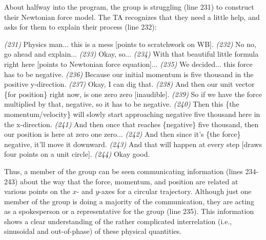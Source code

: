 \documentclass{msuphddissertation}
\begin{document}
\begin{doublespace}
About halfway into the program, the group is struggling (line 231) to construct their Newtonian force model.  The TA recognizes that they need a little help, and asks for them to explain their process (line 232):\begin{description}
\SB \textit{(231)} Physics man... this is a mess [points to scratchwork on WB].
\TA \textit{(232)} No no, go ahead and explain...
\SB \textit{(233)} Okay, so...		
\SB \textit{(234)} With that beautiful little formula right here [points to Newtonian force equation]...	
\SB \textit{(235)} We decided... this {force} has to be negative.
\SB \textit{(236)} Because our initial momentum is five thousand in the positive y-direction.		
\TA \textit{(237)} Okay, I can dig that.
\SB \textit{(238)} And then our unit vector \{for position\} right now, is one zero zero [inaudible].
\SB \textit{(239)} So if we have the force multiplied by that, negative, so it has to be negative.		
\SB \textit{(240)} Then this \{the momentum/velocity\} will slowly start approaching negative five thousand here {in the x-direction}.
\SB \textit{(241)} And then once that reaches \{negative\} five thousand, then our position is here {at zero one zero}...		
\SB \textit{(242)} And then since it's \{the force\} negative, it'll move it downward.
\SB \textit{(243)} And that will happen at every step [draws four points on a unit circle].
\TA \textit{(244)} Okay good.			
\end{description}  Thus, a member of the group can be seen communicating information (lines 234-243) about the way that the force, momentum, and position are related at various points on the $x$- and $y$-axes for a circular trajectory.  Although just one member of the group is doing a majority of the communication, they are acting as a spokesperson or a representative for the group (line 235).  This information shows a clear understanding of the rather complicated interrelation (i.e., sinusoidal and out-of-phase) of these physical quantities.


\end{doublespace}
\end{document}

